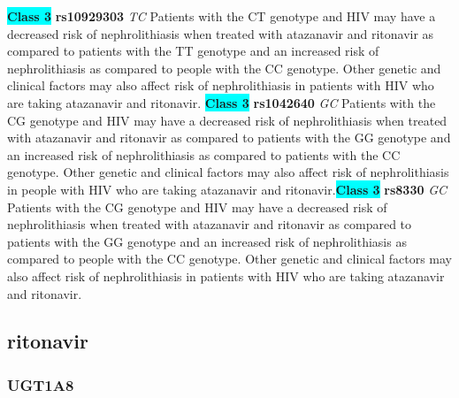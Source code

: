 \documentclass{book}
\begin{document}
\begin{center}
\textbf{\colorbox{cyan} {Class 3}} \textbf{ rs10929303 } \textit{ TC }
Patients with the CT genotype and HIV may have a decreased risk of nephrolithiasis when treated with atazanavir and ritonavir as compared to patients with the TT genotype and an increased risk of nephrolithiasis as compared to people with the CC genotype. Other genetic and clinical factors may also affect risk of nephrolithiasis in patients with HIV who are taking atazanavir and ritonavir. \textbf{\colorbox{cyan} {Class 3}} \textbf{ rs1042640 } \textit{ GC }
Patients with the CG genotype and HIV may have a decreased risk of nephrolithiasis when treated with atazanavir and ritonavir as compared to patients with the GG genotype and an increased risk of nephrolithiasis as compared to patients with the CC genotype. Other genetic and clinical factors may also affect risk of nephrolithiasis in people with HIV who are taking atazanavir and ritonavir.\textbf{\colorbox{cyan} {Class 3}} \textbf{ rs8330 } \textit{ GC }
Patients with the CG genotype and HIV may have a decreased risk of nephrolithiasis when treated with atazanavir and ritonavir as compared to patients with the GG genotype and an increased risk of nephrolithiasis as compared to people with the CC genotype. Other genetic and clinical factors may also affect risk of nephrolithiasis in patients with HIV who are taking atazanavir and ritonavir.


\end{center}\subsection{ ritonavir }


\subsubsection{ UGT1A8 }
\end{document}
